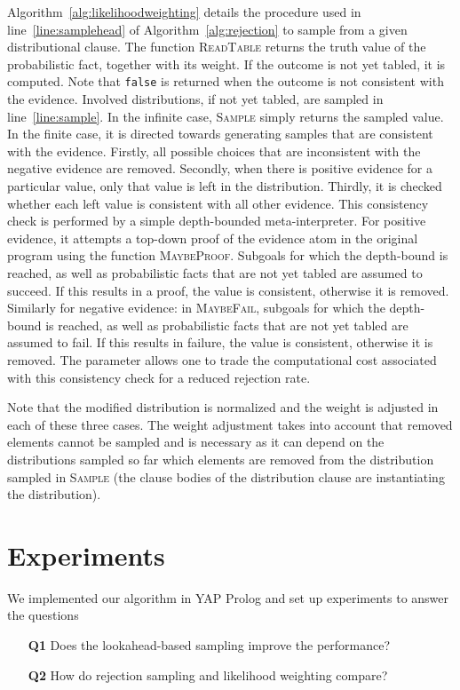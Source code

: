 \documentclass{tlp}
\begin{document}
Algorithm~\ref{alg:likelihoodweighting} details the procedure used in
line~\ref{line:samplehead} of Algorithm~\ref{alg:rejection} to sample
from a given distributional clause. The function \textsc{ReadTable}
returns the truth value of the probabilistic fact, together with its
weight. If the outcome is not yet tabled, it is computed. Note that
\texttt{false} is returned when the outcome is not consistent with the
evidence. Involved distributions, if not yet tabled, are sampled in
line~\ref{line:sample}. In the infinite case, \textsc{Sample} simply
returns the sampled value. In the finite case, it is directed towards
generating samples that are consistent with the evidence. Firstly, all
possible choices that are inconsistent with the negative evidence are
removed. Secondly, when there is positive evidence for a particular
value, only that value is left in the distribution. Thirdly, it is
checked whether each left value is consistent with all other
evidence. This consistency check is performed by a simple
depth-bounded meta-interpreter. For positive evidence, it attempts a
top-down proof of the evidence atom in the original program using the
function \textsc{MaybeProof}. Subgoals for which the depth-bound is
reached, as well as probabilistic facts that are not yet tabled are
assumed to succeed. If this results in a proof, the value is
consistent, otherwise it is removed. Similarly for negative evidence:
in \textsc{MaybeFail}, subgoals for which the depth-bound is reached,
as well as probabilistic facts that are not yet tabled are assumed to
fail. If this results in failure, the value is consistent, otherwise
it is removed. The  parameter allows one to trade the
computational cost associated with this consistency check for a
reduced rejection rate.

Note that the modified distribution is normalized and the weight is
adjusted in each of these three cases. The weight adjustment takes
into account that removed elements cannot be sampled and is necessary
as it can depend on the distributions sampled so far which elements
are removed from the distribution sampled in \textsc{Sample} (the
clause bodies of the distribution clause are instantiating the
distribution).

\section{Experiments}
\label{sec:experiments}

We implemented our algorithm in YAP Prolog and set up experiments to
answer the questions
\begin{itemize}
\item[\textbf{Q1}] Does the lookahead-based sampling improve the
  performance?
\item[\textbf{Q2}] How do rejection sampling and likelihood weighting compare?
\end{itemize}
\end{document}
